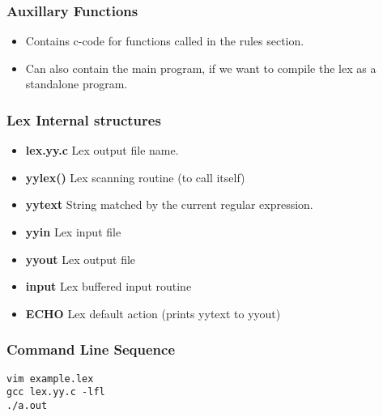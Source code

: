 \documentclass{report}
\theoremstyle{definition}
\begin{document}
			\subsubsection{Auxillary Functions}
				\begin{itemize}
					\item Contains c-code for functions called in the rules section.
					\item Can also contain the main program, if we want to compile the lex as a standalone program.
				\end{itemize}
			\subsubsection{Lex Internal structures}
				\begin{itemize}
					\item \textbf{lex.yy.c} Lex output file name.
					\item \textbf{yylex()} Lex scanning routine (to call itself)
					\item \textbf{yytext} String matched by the current regular expression.
					\item \textbf{yyin} Lex input file
					\item \textbf{yyout} Lex output file
					\item \textbf{input} Lex buffered input routine
					\item \textbf{ECHO} Lex default action (prints yytext to yyout)
				\end{itemize}
			\subsubsection{Command Line Sequence}
\begin{lstlisting}
vim example.lex
gcc lex.yy.c -lfl
./a.out
\end{lstlisting}
\end{document}
